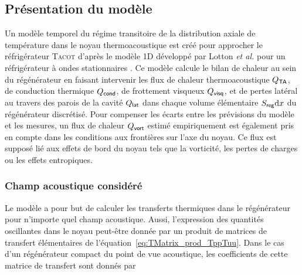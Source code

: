 \subsection{Présentation du modèle}
Un modèle temporel du régime transitoire de la distribution axiale de température dans le noyau thermoacoustique est créé pour approcher le réfrigérateur \textsc{Tacot} d'après le modèle 1D développé par Lotton \textit{et al.} pour un réfrigérateur à ondes stationnaires \cite{lotton_transient_2009}. Ce modèle calcule le bilan de chaleur au sein du régénérateur en faisant intervenir les flux de chaleur thermoacoustique $Q_{\sf TA}$, de conduction thermique $Q_{\sf cond}$, de frottement visqueux $Q_{\sf visq}$, et de pertes latéral au travers des parois de la cavité $Q_{\sf lat}$ dans chaque volume élémentaire $S_{\sf reg} \mathrm{d} x$ du régénérateur discrétisé. Pour compenser les écarts entre les prévisions du modèle et les mesures, un flux de chaleur $Q_{\sf vort}$ estimé empiriquement est également pris en compte dans les conditions aux frontières sur l'axe du noyau. Ce flux est supposé lié aux effets de bord du noyau tels que la vorticité, les pertes de charges ou les effets entropiques. 

\subsubsection{Champ acoustique considéré}
Le modèle a pour but de calculer les transferts thermiques dans le régénérateur pour n'importe quel champ acoustique. Aussi, l'expression des quantités oscillantes dans le noyau peut-être donnée par un produit de matrices de transfert élémentaires de l'équation~\eqref{eq:TMatrix_prod_TppTuu}. Dans le cas d'un régénérateur compact du point de vue acoustique, les coefficients de cette matrice de transfert sont donnés par


